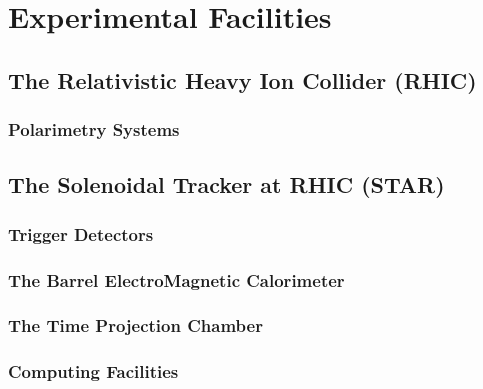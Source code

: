 \chapter{Experimental Facilities}

\section{The Relativistic Heavy Ion Collider (RHIC)}

\subsection{Polarimetry Systems}

\section{The Solenoidal Tracker at RHIC (STAR)}

\subsection{Trigger Detectors}

\subsection{The Barrel ElectroMagnetic Calorimeter}

\subsection{The Time Projection Chamber}

\subsection{Computing Facilities}
